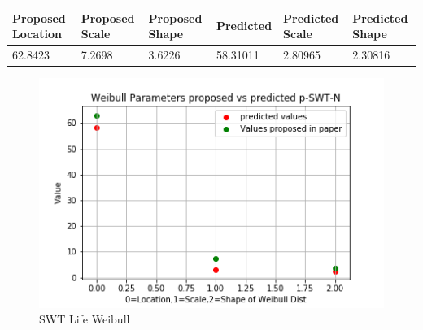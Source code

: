 \documentclass[11pt]{article}
\begin{document}
\begin{longtable}[]{@{}llllll@{}}
\toprule
\begin{minipage}[b]{0.14\columnwidth}\raggedright
Proposed Location\strut
\end{minipage} & \begin{minipage}[b]{0.14\columnwidth}\raggedright
Proposed Scale\strut
\end{minipage} & \begin{minipage}[b]{0.14\columnwidth}\raggedright
Proposed Shape\strut
\end{minipage} & \begin{minipage}[b]{0.14\columnwidth}\raggedright
Predicted\strut
\end{minipage} & \begin{minipage}[b]{0.14\columnwidth}\raggedright
Predicted Scale\strut
\end{minipage} & \begin{minipage}[b]{0.14\columnwidth}\raggedright
Predicted Shape\strut
\end{minipage}\tabularnewline
\midrule
\endhead
\begin{minipage}[t]{0.14\columnwidth}\raggedright
62.8423\strut
\end{minipage} & \begin{minipage}[t]{0.14\columnwidth}\raggedright
7.2698\strut
\end{minipage} & \begin{minipage}[t]{0.14\columnwidth}\raggedright
3.6226\strut
\end{minipage} & \begin{minipage}[t]{0.14\columnwidth}\raggedright
58.31011\strut
\end{minipage} & \begin{minipage}[t]{0.14\columnwidth}\raggedright
2.80965\strut
\end{minipage} & \begin{minipage}[t]{0.14\columnwidth}\raggedright
2.30816\strut
\end{minipage}\tabularnewline
\bottomrule
\end{longtable}

\begin{figure}
\centering
\includegraphics{images/PWMPlotswt.png}
\caption{SWT Life Weibull}
\end{figure}
\end{document}
